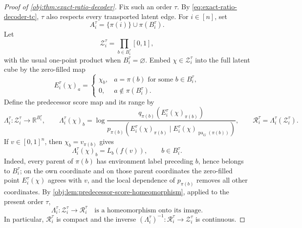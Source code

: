 \begin{proof}[Proof of \cref{obj:thm:exact-ratio-decoder}]
Fix such an order \(\tau\). By \cref{eq:exact-ratio-decoder-tc}, \(\tau\) also respects every transported latent edge. For \(i\in[n]\), set
\[
A_i^\tau=\{\pi(i)\}\cup\pi(B_i^\tau).
\]
Let
\[
\mathcal Z_i^\tau=\prod_{b\in B_i^\tau}[0,1],
\]
with the usual one-point product when \(B_i^\tau=\varnothing\). Embed \(\chi\in\mathcal Z_i^\tau\) into the full latent cube by the zero-filled map
\[
E_i^\tau(\chi)_a=
\begin{cases}
\chi_b, & a=\pi(b)\text{ for some }b\in B_i^\tau,\\
0, & a\notin\pi(B_i^\tau).
\end{cases}
\]
Define the predecessor score map and its range by
\[
\Lambda_i^\tau:\mathcal Z_i^\tau\to\mathbb R^{B_i^\tau},
\qquad
\Lambda_i^\tau(\chi)_b
=
\log
\frac{q_{\pi(b)}\!\left(E_i^\tau(\chi)_{\pi(b)}\right)}
{p_{\pi(b)}\!\left(E_i^\tau(\chi)_{\pi(b)}\mid
E_i^\tau(\chi)_{\operatorname{pa}_G(\pi(b))}\right)},
\qquad
\mathcal R_i^\tau=\Lambda_i^\tau(\mathcal Z_i^\tau).
\]
If \(v\in[0,1]^n\), then \(\chi_b=v_{\pi(b)}\) gives
\[
\Lambda_i^\tau(\chi)_b=L_b(f(v)),
\qquad b\in B_i^\tau.
\]
Indeed, every parent of \(\pi(b)\) has environment label preceding \(b\), hence belongs to \(B_i^\tau\); on the own coordinate and on those parent coordinates the zero-filled point \(E_i^\tau(\chi)\) agrees with \(v\), and the local dependence of \(p_{\pi(b)}\) removes all other coordinates. By \cref{obj:lem:predecessor-score-homeomorphism}, applied to the present order \(\tau\),
\begin{equation}
\Lambda_i^\tau:\mathcal Z_i^\tau\longrightarrow\mathcal R_i^\tau
\quad\text{is a homeomorphism onto its image.}
\label{eq:exact-ratio-decoder-predecessor-homeomorphism}
\end{equation}
In particular, \(\mathcal R_i^\tau\) is compact and the inverse \((\Lambda_i^\tau)^{-1}:\mathcal R_i^\tau\to\mathcal Z_i^\tau\) is continuous. %


\end{proof}
